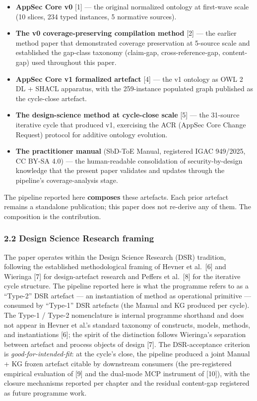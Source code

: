 \documentclass[
]{article}
\providecommand{\tightlist}{%
  \setlength{\itemsep}{0pt}\setlength{\parskip}{0pt}}
\begin{document}
\begin{itemize}
\tightlist
\item
  \textbf{AppSec Core v0} {[}1{]} --- the original normalized ontology
  at first-wave scale (10 slices, 234 typed instances, 5 normative
  sources).
\item
  \textbf{The v0 coverage-preserving compilation method} {[}2{]} --- the
  earlier method paper that demonstrated coverage preservation at
  5-source scale and established the gap-class taxonomy (claim-gap,
  cross-reference-gap, content-gap) used throughout this paper.
\item
  \textbf{AppSec Core v1 formalized artefact} {[}4{]} --- the v1
  ontology as OWL 2 DL + SHACL apparatus, with the 259-instance
  populated graph published as the cycle-close artefact.
\item
  \textbf{The design-science method at cycle-close scale} {[}5{]} ---
  the 31-source iterative cycle that produced v1, exercising the ACR
  (AppSec Core Change Request) protocol for additive ontology evolution.
\item
  \textbf{The practitioner manual} (SbD-ToE Manual, registered IGAC
  949/2025, CC BY-SA 4.0) --- the human-readable consolidation of
  security-by-design knowledge that the present paper validates and
  updates through the pipeline's coverage-analysis stage.
\end{itemize}

The pipeline reported here \textbf{composes} these artefacts. Each prior
artefact remains a standalone publication; this paper does not re-derive
any of them. The composition is the contribution.

\subsubsection{2.2 Design Science Research
framing}\label{design-science-research-framing}

The paper operates within the Design Science Research (DSR) tradition,
following the established methodological framing of Hevner et
al.~{[}6{]} and Wieringa {[}7{]} for design-artefact research and
Peffers et al.~{[}8{]} for the iterative cycle structure. The pipeline
reported here is what the programme refers to as a ``Type-2'' DSR
artefact --- an instantiation of method as operational primitive ---
consumed by ``Type-1'' DSR artefacts (the Manual and KG produced per
cycle). The Type-1 / Type-2 nomenclature is internal programme shorthand
and does not appear in Hevner et al.'s standard taxonomy of constructs,
models, methods, and instantiations {[}6{]}; the spirit of the
distinction follows Wieringa's separation between artefact and process
objects of design {[}7{]}. The DSR-acceptance criterion is
\emph{good-for-intended-fit}: at the cycle's close, the pipeline
produced a joint Manual + KG frozen artefact citable by downstream
consumers (the pre-registered empirical evaluation of {[}9{]} and the
dual-mode MCP instrument of {[}10{]}), with the closure mechanisms
reported per chapter and the residual content-gap registered as future
programme work.
\end{document}
